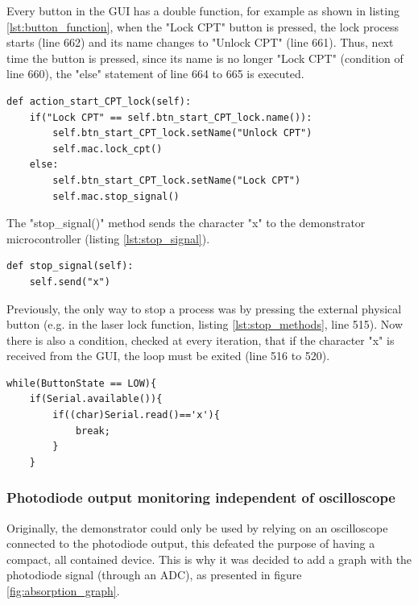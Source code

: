 \documentclass[a4paper,12pt]{article}
\begin{document}
Every button in the GUI has a double function, for example as shown in listing \ref{lst:button_function}, when the "Lock CPT" button is pressed, the lock process starts (line 662) and its name changes to "Unlock CPT" (line 661). Thus, next time the button is pressed, since its name is no longer "Lock CPT" (condition of line 660), the "else" statement of line 664 to 665 is executed.

\begin{lstlisting}[style=python,label={lst:button_function},caption={Double function for GUI buttons (file: qt\_mac.py).},firstnumber=659]
def action_start_CPT_lock(self):
    if("Lock CPT" == self.btn_start_CPT_lock.name()):
        self.btn_start_CPT_lock.setName("Unlock CPT")
        self.mac.lock_cpt()
    else:
        self.btn_start_CPT_lock.setName("Lock CPT")
        self.mac.stop_signal()
\end{lstlisting}

The "stop\_signal()" method sends the character "x" to the demonstrator microcontroller (listing \ref{lst:stop_signal}).

\begin{lstlisting}[style=python,label={lst:stop_signal},caption={Stop signal method (file: mac\_device.py).},firstnumber=245]
def stop_signal(self):
    self.send("x")
\end{lstlisting}

Previously, the only way to stop a process was by pressing the external physical button (e.g. in the laser lock function, listing \ref{lst:stop_methods}, line 515). Now there is also a condition, checked at every iteration, that if the character "x" is received from the GUI, the loop must be exited (line 516 to 520).

\begin{lstlisting}[style=c++,label={lst:stop_methods},caption={Stop signal methods in laser lock function (file: mac.ino).},firstnumber=515]
while(ButtonState == LOW){
    if(Serial.available()){
        if((char)Serial.read()=='x'){
            break;
        }
    }
\end{lstlisting}

\subsubsection{Photodiode output monitoring independent of oscilloscope}
\label{section:output_monitoring}

Originally, the demonstrator could only be used by relying on an oscilloscope connected to the photodiode output, this defeated the purpose of having a compact, all contained device. This is why it was decided to add a graph with the photodiode signal (through an ADC), as presented in figure \ref{fig:absorption_graph}.
\end{document}
